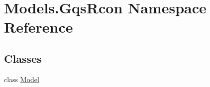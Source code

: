 \hypertarget{namespace_models_1_1_gqs_rcon}{\section{Models.\-Gqs\-Rcon Namespace Reference}
\label{namespace_models_1_1_gqs_rcon}
}
\subsection*{Classes}
\begin{DoxyCompactItemize}
\item 
class \hyperlink{class_models_1_1_gqs_rcon_1_1_model}{Model}
\end{DoxyCompactItemize}
